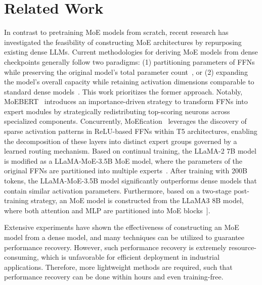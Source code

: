 \section{Related Work}

In contrast to pretraining MoE models from scratch, recent research has investigated the feasibility of constructing MoE architectures by repurposing existing dense LLMs. 
Current methodologies for deriving MoE models from dense checkpoints generally follow two paradigms: (1) partitioning parameters of FFNs while preserving the original model’s total parameter count~\cite{zuo2022moebert,moefication}, or (2) expanding the model’s overall capacity while retaining activation dimensions comparable to standard dense models~\cite{komatsuzaki2022sparse,wu2024parameter}. 
This work prioritizes the former approach.
Notably, MoEBERT~\cite{zuo2022moebert} introduces an importance-driven strategy to transform FFNs into expert modules by strategically redistributing top-scoring neurons across specialized components. Concurrently, MoEfication~\cite{moefication} leverages the discovery of sparse activation patterns in ReLU-based FFNs within T5 architectures, enabling the decomposition of these layers into distinct expert groups governed by a learned routing mechanism.
Based on continual training, the LLaMA-2 7B model is modified as a LLaMA-MoE-3.5B MoE model, where the parameters of the original FFNs are partitioned into multiple experts~\cite{llama-moe}. After training with 200B tokens, the LLaMA-MoE-3.5B model significantly outperforms dense models that contain similar activation parameters. Furthermore, based on a two-stage post-training strategy, an MoE model is constructed from the LLaMA3 8B model, where both attention and MLP are partitioned into MoE blocks~\cite{llama-moe-v2}]. 

Extensive experiments have shown the effectiveness of constructing an MoE model from a dense model, and many techniques can be utilized to guarantee performance recovery. However, such performance recovery is extremely resource-consuming, which is unfavorable for efficient deployment in industrial applications. Therefore, more lightweight methods are required, such that performance recovery can be done within hours and even training-free.


